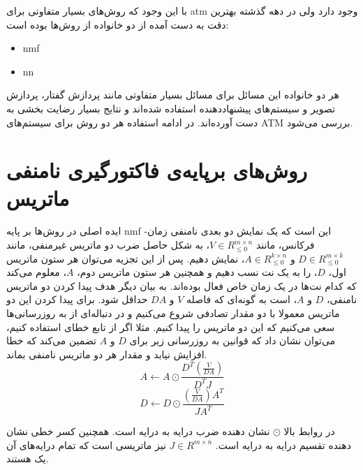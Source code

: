 با این وجود که روش‌های بسیار متفاوتی برای \gls{atm} وجود دارد ولی در دهه گذشته
بهترین دقت به دست آمده از دو خانواده از روش‌ها بوده است:
\begin{itemize}
    \item \gls{nmf}
    \item \gls{nn}
\end{itemize}
هر دو خانواده این مسائل برای مسائل بسیار متفاوتی مانند پردازش گفتار، پردازش
تصویر و سیستم‌های پیشنهاددهنده استفاده شده‌اند و نتایج بسیار رضایت بخشی به دست
آورده‌اند. در ادامه استفاده هر دو روش برای سیستم‌های \gls{ATM} بررسی می‌شود.

\section{روش‌های برپایه‌ی فاکتورگیری نامنفی ماتریس}
ایده اصلی در روش‌ها بر پایه \gls{nmf} این است که یک نمایش دو بعدی نامنفی
زمان-فرکانس، مانند $V \in R_{\leq 0}^{m \times n}$، به شکل حاصل ضرب دو ماتریس
غیرمنفی، مانند $D \in R_{\leq 0}^{m \times k}$ و $A \in R_{\leq 0}^{k \times
n}$، نمایش دهیم. پس از این تجزیه می‌توان هر ستون ماتریس اول، $D$، را به یک نت نسب
دهیم و همچنین هر ستون ماتریس دوم، $A$، معلوم می‌کند که کدام نت‌ها در یک زمان خاص
فعال بوده‌اند. به بیان دیگر هدف پیدا کردن دو ماتریس نامنفی، $D$ و $A$، است به
گونه‌ای که فاصله $V$ و $DA$ حداقل شود. برای پیدا کردن این دو ماتریس معمولا با دو
مقدار تصادفی شروع می‌کنیم و در دنباله‌ای از به روزرسانی‌ها سعی می‌کنیم که این دو
ماتریس را پیدا کنیم. مثلا اگر از تابع خطای  استفاده کنیم،
می‌توان نشان داد که قوانین به روزرسانی زیر برای $D$ و $A$ تضمین می‌کند که خطا
افزایش نیابد و مقدار هر دو ماتریس نامنفی بماند.
\begin{equation}
    A \leftarrow A \odot \frac{D^T(\frac{V}{DA})}{D^T J}
\end{equation}
\begin{equation}
    D \leftarrow D \odot \frac{(\frac{V}{DA})A^T}{J A^T}
\end{equation}

در روابط بالا $\odot$ نشان دهنده ضرب درایه به درایه است. همچنین کسر خطی نشان
دهنده تقسیم درایه به درایه است. $J \in R^{m \times n}$ نیز ماتریسی است که تمام
درایه‌های آن یک هستند.

